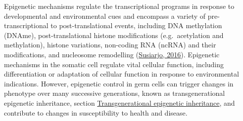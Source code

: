 \documentclass[12pt,twoside]{reedthesis}
\begin{document}
Epigenetic mechanisms regulate the transcriptional programs in response
to developmental and environmental cues and encompass a variety of
pre-transcriptional to post-translational events, including DNA
methylation (DNAme), post-translational histone modifications (e.g.~acetylation
and methylation), histone variations, non-coding RNA (ncRNA) and their
modifications, and nucleosome remodelling (\protect\hyperlink{ref-susiarjo2016}{Susiarjo, 2016}). Epigenetic
mechanisms in the somatic cell regulate vital cellular function,
including differentiation or adaptation of cellular function in response
to environmental indications. However, epigenetic control in germ cells
can trigger changes in phenotype over many successive generations, known
as transgenerational epigenetic inheritance, section \protect\hyperlink{tei}{Transgenerational
epigenetic inheritance}, and contribute to changes in
susceptibility to health and disease.
\end{document}
